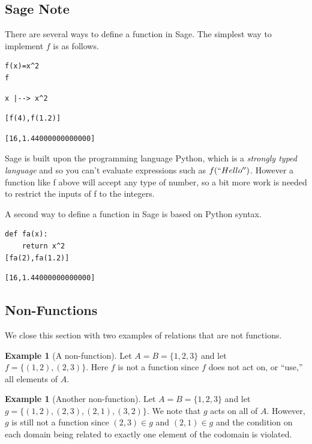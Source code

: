 \documentclass[10pt,]{book}
\theoremstyle{plain}
\theoremstyle{definition}
\theoremstyle{definition}
\newtheorem{example}[theorem]{Example}
\theoremstyle{definition}
\begin{document}
\subsection[Sage Note]{Sage Note}\label{ss-sage-note-functions}
There are several ways to define a function in Sage. The simplest way to implement \(f\) is as follows.%
\begin{lstlisting}[style=sageinput]
f(x)=x^2
f
\end{lstlisting}
\begin{lstlisting}[style=sageoutput]
x |--> x^2
\end{lstlisting}
\begin{lstlisting}[style=sageinput]
[f(4),f(1.2)]
\end{lstlisting}
\begin{lstlisting}[style=sageoutput]
[16,1.44000000000000]
\end{lstlisting}
\par
Sage is built upon the programming language Python, which is a \emph{strongly typed language} and so you can't evaluate expressions such as \(f(``Hello'')\). However a function like f above will accept any type of number, so a bit more work is needed to restrict the inputs of f to the integers.%
\par
A second way to define a function in Sage is based on Python syntax.%
\begin{lstlisting}[style=sageinput]
def fa(x):
	return x^2
[fa(2),fa(1.2)]
\end{lstlisting}
\begin{lstlisting}[style=sageoutput]
[16,1.44000000000000]
\end{lstlisting}
\typeout{************************************************}
\typeout{************************************************}
\subsection[Non-Functions]{Non-Functions}\label{ss-non-functions}
We close this section with two examples of relations that are not functions.%
\begin{example}[A non-function]\label{ex-nonfunction1}
 Let \(A = B = \{1, 2, 3\}\) and let \(f= \{(1, 2), (2, 3)\}\). Here \(f\) is not a function since \(f\) does not
act on, or ``use,'' all elements of \(A\).%
\end{example}
\begin{example}[Another non-function]\label{ex-nonfunction2}
 Let \(A = B = \{1,2, 3\}\) and let \(g = \{(1, 2), (2, 3), (2, 1),(3, 2)\}\). We note that \(g\) acts on all of \(A\).  However, \(g\) is still not a function since \((2, 3) \in  g\) and \((2, 1) \in  g\) and the condition on each domain being related
to exactly one element of the codomain is violated.%
\end{example}
\typeout{************************************************}
\typeout{************************************************}
\end{document}
